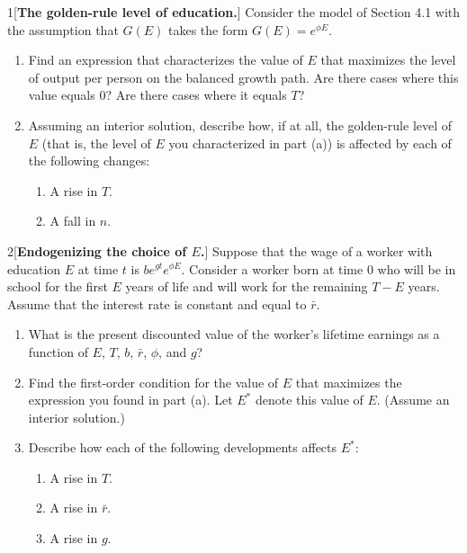 
\begin{problem}{1}[\textbf{The golden-rule level of education.}]
Consider the model of Section 4.1 with the assumption that \(G\left(E\right)\) takes the form \(G\left(E\right)=e^{\phi E}\).
\begin{enumerate}[label=(\alph*)]
    \item Find an expression that characterizes the value of \(E\) that maximizes the level of output per person on the balanced growth path. Are there cases where this value equals 0? Are there cases where it equals \(T\)?
    \item Assuming an interior solution, describe how, if at all, the golden-rule level of \(E\) (that is, the level of \(E\) you characterized in part (a)) is affected by each of the following changes:
    \begin{enumerate}[label=(\roman*)]
        \item A rise in \(T\).
        \item A fall in \(n\).
    \end{enumerate}
\end{enumerate}
\end{problem}

\begin{problem}{2}[\textbf{Endogenizing the choice of \(E\).}]
Suppose that the wage of a worker with education \(E\) at time \(t\) is \(be^{gt}e^{\phi E}\). Consider a worker born at time 0 who will be in school for the first \(E\) years of life and will work for the remaining \(T-E\) years. Assume that the interest rate is constant and equal to \(\bar{r}\).
\begin{enumerate}[label=(\alph*)]
    \item What is the present discounted value of the worker's lifetime earnings as a function of \(E\), \(T\), \(b\), \(\bar{r}\), \(\phi\), and \(g\)?
    \item Find the first-order condition for the value of \(E\) that maximizes the expression you found in part (a). Let \(E^*\) denote this value of \(E\). (Assume an interior solution.)
    \item Describe how each of the following developments affects \(E^*\):
    \begin{enumerate}[label=(\roman*)]
        \item A rise in \(T\).
        \item A rise in \(\bar{r}\).
        \item A rise in \(g\).
    \end{enumerate}
\end{enumerate}
\end{problem}

